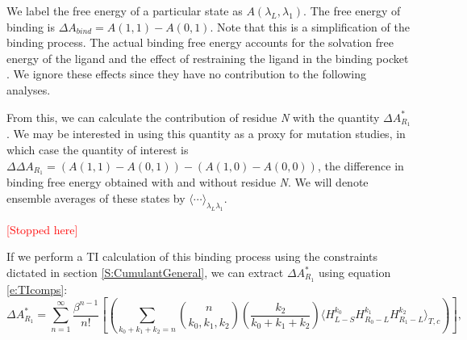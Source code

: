 \documentclass[%
 preprint,
 amsmath,amssymb,
 aps,
]{revtex4-1}
\newcommand{\warning}[1]{{\textsf{{\textcolor{red}{{[#1]}{}}}}}}
\renewcommand{\vec}[1]{{\bm{#1}}}
\begin{document}
We label the free energy of a particular state as $A(\lambda_L,\lambda_1)$.  The free energy of binding is 
$\Delta A_{bind} = A\left(1,1\right) - 
A\left(0,1 \right)$. 
Note that this is a simplification of the binding process.  The actual binding free energy accounts for the solvation free energy of the ligand and the effect of restraining the ligand in the binding pocket \cite{NULL}.  We ignore these effects
since they have no contribution to the following analyses. 


 From this, we can calculate the contribution of residue \emph{N} with the quantity $\Delta A^*_{R_1}$.  
 We may be interested in using this quantity as a proxy for mutation studies, in which case the quantity of interest is 
 $\Delta \Delta A_{R_1} = \left( A\left(1,1\right) - A\left(0,1\right) \right) -
 \left( A\left(1,0 \right)- A\left(0,0 \right)\right) $, 
 the difference in binding free energy obtained with and without residue \emph{N}.  
 We will denote ensemble averages of these states by $\langle \cdots \rangle_{\lambda_L \lambda_1}$.  
 
 \warning{Stopped here}
 
If we perform a TI calculation of this binding process using the constraints dictated in section \ref{S:CumulantGeneral}, we can extract $\Delta A^*_{R_1}$ using equation \ref{e:TIcomps}:
 \begin{equation}
\Delta A^*_ {R_1}=
\sum_{n=1}^{\infty}  \frac{\beta^{n-1}}{n!} 
\left[
\left(
 \sum_{k_0+k_1+k_2=n} 
{ n \choose k_0,k_1,k_2 } \left( \frac{k_2}{k_0+k_1+k_2} \right) \langle  H_{L-S}^{k_0} H_{R_0-L}^{k_1} H_{R_1-L}^{k_2} 
\rangle_{T,c}
\right)
\right],
\label{e:BradyDecomp:CBR}
\end{equation}
 
\end{document}
